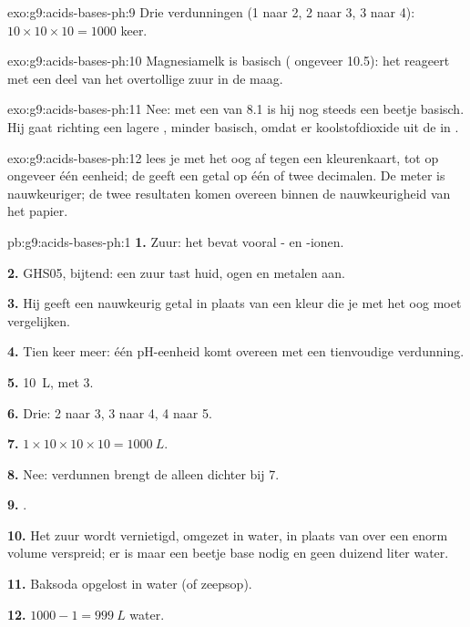 \begin{solution}{exo:g9:acids-bases-ph:9}
Drie verdunningen (1 naar 2, 2 naar 3, 3 naar 4): $10 \times 10 \times 10 =
1000$ keer.
\end{solution}

\begin{solution}{exo:g9:acids-bases-ph:10}
Magnesiamelk is basisch ( ongeveer 10.5): het reageert met een deel
van het overtollige zuur in de maag.
\end{solution}

\begin{solution}{exo:g9:acids-bases-ph:11}
Nee: met een  van 8.1 is hij nog steeds een beetje basisch. Hij gaat
richting een lagere , minder basisch, omdat er koolstofdioxide uit de
 in .
\end{solution}

\begin{solution}{exo:g9:acids-bases-ph:12}
 lees je met het oog af tegen een kleurenkaart, tot op ongeveer
één eenheid; de  geeft een getal op één of twee decimalen. De
meter is nauwkeuriger; de twee resultaten komen overeen binnen de
nauwkeurigheid van het papier.
\end{solution}

\begin{solution}{pb:g9:acids-bases-ph:1}
\textbf{1.} Zuur: het bevat vooral - en -ionen.

\textbf{2.} GHS05, bijtend: een zuur tast huid, ogen en metalen aan.

\textbf{3.} Hij geeft een nauwkeurig getal in plaats van een kleur die je
met het oog moet vergelijken.

\textbf{4.} Tien keer meer: één pH-eenheid komt overeen met een
tienvoudige verdunning.

\textbf{5.} \qty{10}{L}, met  3.

\textbf{6.} Drie:  2 naar 3, 3 naar 4, 4 naar 5.

\textbf{7.} $1 \times 10 \times 10 \times 10 = \qty{1000}{L}$.

\textbf{8.} Nee: verdunnen brengt de  alleen dichter bij 7.

\textbf{9.} .

\textbf{10.} Het zuur wordt vernietigd, omgezet in water, in plaats van
over een enorm volume verspreid; er is maar een beetje base nodig en
geen duizend liter water.

\textbf{11.} Baksoda opgelost in water (of zeepsop).

\textbf{12.} $1000 - 1 = \qty{999}{L}$ water.
\end{solution}

